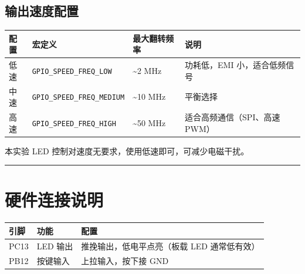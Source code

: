 \documentclass[
  chinese,
  UTF8,
  oneside,
  openany]{ctexbook}
\begin{document}
\subsection{输出速度配置}\label{ux8f93ux51faux901fux5ea6ux914dux7f6e}

\begin{longtable}[]{@{}
  >{\raggedright\arraybackslash}p{}
  >{\raggedright\arraybackslash}p{}
  >{\raggedright\arraybackslash}p{}
  >{\raggedright\arraybackslash}p{}@{}}
\toprule\noalign{}
\begin{minipage}[b]{\linewidth}\raggedright
配置
\end{minipage} & \begin{minipage}[b]{\linewidth}\raggedright
宏定义
\end{minipage} & \begin{minipage}[b]{\linewidth}\raggedright
最大翻转频率
\end{minipage} & \begin{minipage}[b]{\linewidth}\raggedright
说明
\end{minipage} \\
\midrule\noalign{}
\endhead
\bottomrule\noalign{}
\endlastfoot
低速 & \texttt{GPIO\_SPEED\_FREQ\_LOW} & \textasciitilde2 MHz &
功耗低，EMI 小，适合低频信号 \\
中速 & \texttt{GPIO\_SPEED\_FREQ\_MEDIUM} & \textasciitilde10 MHz &
平衡选择 \\
高速 & \texttt{GPIO\_SPEED\_FREQ\_HIGH} & \textasciitilde50 MHz &
适合高频通信（SPI、高速 PWM） \\
\end{longtable}

本实验 LED 控制对速度无要求，使用低速即可，可减少电磁干扰。

\begin{center}\rule{0.5\linewidth}{0.5pt}\end{center}

\section{硬件连接说明}\label{ux786cux4ef6ux8fdeux63a5ux8bf4ux660e}

\begin{longtable}[]{@{}lll@{}}
\toprule\noalign{}
引脚 & 功能 & 配置 \\
\midrule\noalign{}
\endhead
\bottomrule\noalign{}
\endlastfoot
PC13 & LED 输出 & 推挽输出，低电平点亮（板载 LED 通常低有效） \\
PB12 & 按键输入 & 上拉输入，按下接 GND \\
\end{longtable}
\end{document}
